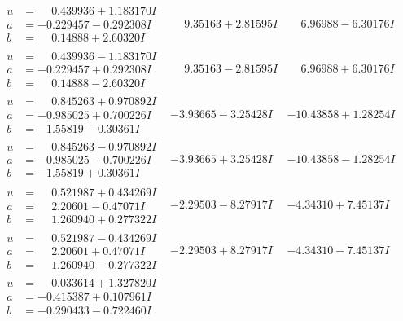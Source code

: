 \documentclass[1p]{elsarticle_modified}
\theoremstyle{definition}
\begin{document}
$$\begin{array}{c|c|c}
\begin{aligned}
u &= \phantom{-}0.439936 + 1.183170 I \\
a &= -0.229457 - 0.292308 I \\
b &= \phantom{-}0.14888 + 2.60320 I\end{aligned}
 & \phantom{-}9.35163 + 2.81595 I & \phantom{-}6.96988 - 6.30176 I \\ \hline\begin{aligned}
u &= \phantom{-}0.439936 - 1.183170 I \\
a &= -0.229457 + 0.292308 I \\
b &= \phantom{-}0.14888 - 2.60320 I\end{aligned}
 & \phantom{-}9.35163 - 2.81595 I & \phantom{-}6.96988 + 6.30176 I \\ \hline\begin{aligned}
u &= \phantom{-}0.845263 + 0.970892 I \\
a &= -0.985025 + 0.700226 I \\
b &= -1.55819 - 0.30361 I\end{aligned}
 & -3.93665 - 3.25428 I & -10.43858 + 1.28254 I \\ \hline\begin{aligned}
u &= \phantom{-}0.845263 - 0.970892 I \\
a &= -0.985025 - 0.700226 I \\
b &= -1.55819 + 0.30361 I\end{aligned}
 & -3.93665 + 3.25428 I & -10.43858 - 1.28254 I \\ \hline\begin{aligned}
u &= \phantom{-}0.521987 + 0.434269 I \\
a &= \phantom{-}2.20601 - 0.47071 I \\
b &= \phantom{-}1.260940 + 0.277322 I\end{aligned}
 & -2.29503 - 8.27917 I & -4.34310 + 7.45137 I \\ \hline\begin{aligned}
u &= \phantom{-}0.521987 - 0.434269 I \\
a &= \phantom{-}2.20601 + 0.47071 I \\
b &= \phantom{-}1.260940 - 0.277322 I\end{aligned}
 & -2.29503 + 8.27917 I & -4.34310 - 7.45137 I \\ \hline\begin{aligned}
u &= \phantom{-}0.033614 + 1.327820 I \\
a &= -0.415387 + 0.107961 I \\
b &= -0.290433 - 0.722460 I\end{aligned}

\end{array}$$
\end{document}

